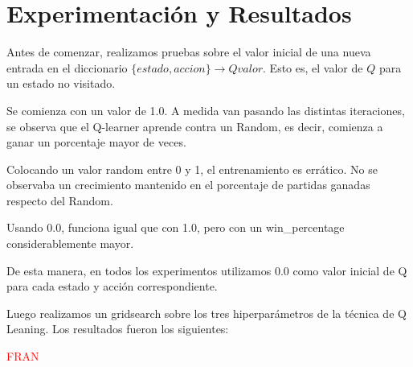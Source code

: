 \section{Experimentación y Resultados}

Antes de comenzar, realizamos pruebas sobre el valor inicial de una nueva entrada en el diccionario $\{estado, accion\} \rightarrow Q valor$. Esto es, el valor de $Q$ para un estado no visitado.

Se comienza con un valor de 1.0. A medida van pasando las distintas iteraciones, se observa que el Q-learner aprende contra un Random, es decir, comienza a ganar un porcentaje mayor de veces.

Colocando un valor random entre 0 y 1, el entrenamiento es errático. No se observaba un crecimiento mantenido en el porcentaje de partidas ganadas respecto del Random.

Usando 0.0, funciona igual que con 1.0, pero con un win\_percentage considerablemente mayor.

De esta manera, en todos los experimentos utilizamos 0.0 como valor inicial de Q para cada estado y acci\'on correspondiente.

Luego realizamos un gridsearch sobre los tres hiperpar\'ametros de la t\'ecnica de Q Leaning. Los resultados fueron los siguientes:

\textcolor{red}{FRAN}


\newpage

\newpage

